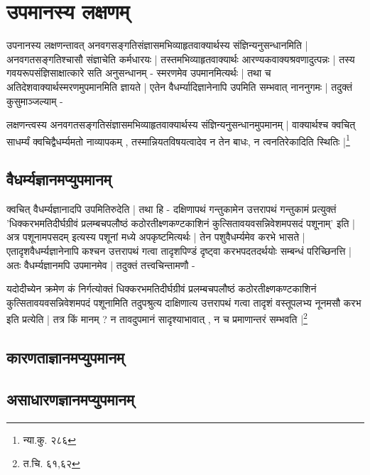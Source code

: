 \section{उपमानस्य लक्षणम्}

उपनानस्य लक्षणन्तावत् अनवगसङ्गतिसंज्ञासमभिव्याहृतवाक्यार्थस्य संज्ञिन्यनुसन्धानमिति | अनवगतसङ्गतिश्चासौ संज्ञाचेति कर्मधारयः | तस्तमभिव्याहृतवाक्यार्थः आरण्यकवाक्यश्रवणादुत्पन्नः | तस्य गवयरूपसंज्ञिसाक्षात्कारे सति अनुसन्धानम् - स्मरणमेव उपमानमित्यर्थः | तथा च अतिदेशवाक्यार्थस्मरणमुपमानमिति ज्ञायते | एतेन वैधर्म्यादिज्ञानेनापि उपमिति सम्भवात् नाननुगमः | तदुक्तं कुसुमाञ्जल्याम् - 

{\fontsize{11.7}{0}\selectfont\s लक्षणन्त्वस्य अनवगतसङ्गतिसंज्ञासमभिव्याहृतवाक्यार्थस्य संज्ञिन्यनुसन्धानमुपमानम् | वाक्यार्थश्च क्वचित् साधर्म्यं क्वचिद्वैधर्म्यमतो नाव्यापकम् , तस्मान्नियतविषयत्वादेव न तेन बाधः, न त्वनतिरेकादिति स्थितिः |\footnote{न्या.कु. २८६}}

\subsection{वैधर्म्यज्ञानमप्युपमानम्}

क्वचित् वैधर्म्यज्ञानादपि उपमितिरुदेति | तथा हि - दक्षिणापथं गन्तुकामेन उत्तरापथं गन्तुकामं प्रत्युक्तं 'धिक्करभमतिदीर्घग्रीवं प्रलम्बचपलौष्ठं कठोरतीक्ष्णकण्टकाशिनं कुत्सितावयवसन्निवेशमपसदं पशूनाम्' इति | अत्र पशूनामपसदम् इत्यस्य पशूनां मध्ये अपकृष्टमित्यर्थः | तेन पशुवैधर्म्यमेव करभे भासते | एतादृशवैधर्म्यज्ञानेनापि कश्चन  उत्तरापथं गत्वा तादृशपिण्डं दृष्ट्वा करभपदतदर्थयोः सम्बन्धं परिच्छिनत्ति | अतः वैधर्म्यज्ञानमपि उपमानमेव | तदुक्तं तत्त्वचिन्तामणौ - 

{\fontsize{11.7}{0}\selectfont\s  यदोदीच्येन क्रमेण कं निर्गत्योक्तं धिक्करभमतिदीर्घग्रीवं प्रलम्बचपलौष्ठं कठोरतीक्ष्णकण्टकाशिनं कुत्सितावयवसन्निवेशमपदं पशूनामिति तदुपश्रुत्य दाक्षिणात्य उत्तरापथं गत्वा तादृशं वस्तूपलभ्य नूनमसौ करभ इति प्रत्येति | तत्र किं मानम् ? न तावदुपमानं सादृश्याभावात् , न च प्रमाणान्तरं सम्भवति |\footnote{त.चि. ६१,६२}}

\subsection{कारणताज्ञानमप्युपमानम्}

\subsection{असाधारणज्ञानमप्युपमानम्}
